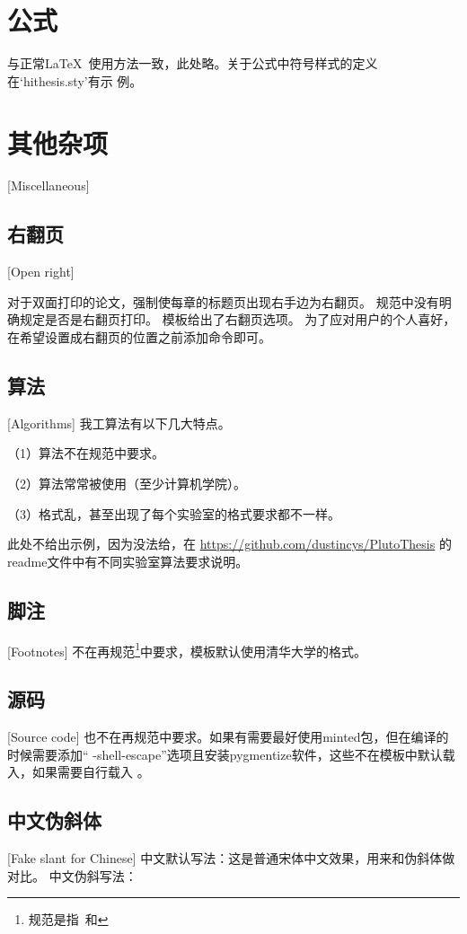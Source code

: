 \section{公式}
与正常\LaTeX\ 使用方法一致，此处略。关于公式中符号样式的定义在`hithesis.sty'有示
例。

\section{其他杂项}[Miscellaneous]

\subsection{右翻页}[Open right]

对于双面打印的论文，强制使每章的标题页出现右手边为右翻页。
规范中没有明确规定是否是右翻页打印。
模板给出了右翻页选项。
为了应对用户的个人喜好，在希望设置成右翻页的位置之前添加命令即可。

\subsection{算法}[Algorithms]
我工算法有以下几大特点。

（1）算法不在规范中要求。

（2）算法常常被使用（至少计算机学院）。

（3）格式乱，甚至出现了每个实验室的格式要求都不一样。

此处不给出示例，因为没法给，在
\href{https://github.com/dustincys/PlutoThesis}{https://github.com/dustincys/PlutoThesis}
的readme文件中有不同实验室算法要求说明。

\subsection{脚注}[Footnotes]
不在再规范\footnote{规范是指\PGR\ 和\UGR}中要求，模板默认使用清华大学的格式。

\subsection{源码}[Source code]
也不在再规范中要求。如果有需要最好使用minted包，但在编译的时候需要添加“
-shell-escape”选项且安装pygmentize软件，这些不在模板中默认载入，如果需要自行载入
。
\subsection{中文伪斜体}[Fake slant for Chinese]
中文默认写法：这是普通宋体中文效果，用来和伪斜体做对比。
中文伪斜写法：

